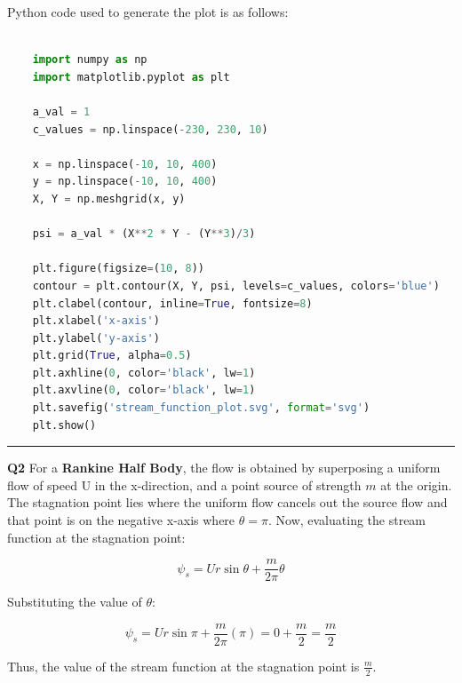 \documentclass[12pt]{article}
\begin{document}
\begin{enumerate}
	      \vspace{1em}

	      Python code used to generate the plot is as follows:

	      \begin{lstlisting}[language=Python, breaklines=true, keywordstyle=\color{blue}\bfseries, stringstyle=\color{red}]

    import numpy as np
    import matplotlib.pyplot as plt

    a_val = 1
    c_values = np.linspace(-230, 230, 10)

    x = np.linspace(-10, 10, 400)
    y = np.linspace(-10, 10, 400)
    X, Y = np.meshgrid(x, y)

    psi = a_val * (X**2 * Y - (Y**3)/3)

    plt.figure(figsize=(10, 8))
    contour = plt.contour(X, Y, psi, levels=c_values, colors='blue')
    plt.clabel(contour, inline=True, fontsize=8)
    plt.xlabel('x-axis')
    plt.ylabel('y-axis')
    plt.grid(True, alpha=0.5)
    plt.axhline(0, color='black', lw=1)
    plt.axvline(0, color='black', lw=1)
    plt.savefig('stream_function_plot.svg', format='svg')
    plt.show()

    \end{lstlisting}

\end{enumerate}

\vspace{1.5em}
\hrule
\vspace{1.5em}

\noindent \textbf{Q2} For a \textbf{Rankine Half Body}, the flow is obtained by superposing a uniform flow of speed U in the x-direction, and a point source of strength $m$ at the origin. The stagnation point lies where the uniform flow cancels out the source flow and that point is on the negative x-axis where $\theta = \pi$. Now, evaluating the stream function at the stagnation point:

\begin{equation*}
	\psi_s = U r \sin \theta + \frac{m}{2\pi} \theta
\end{equation*}

Substituting the value of $\theta$:

\begin{equation*}
	\psi_s = U r \sin \pi + \frac{m}{2\pi} (\pi) = 0 + \frac{m}{2} = \frac{m}{2}
\end{equation*}

Thus, the value of the stream function at the stagnation point is $\frac{m}{2}$.
\end{document}
